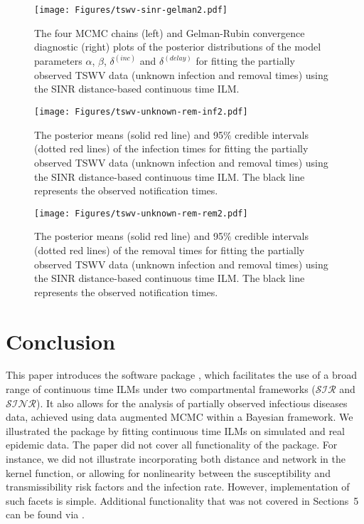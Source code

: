 \documentclass[nojss,shortnames]{jss}
\begin{document}
 
\begin{figure}[!h]
\begin{center}
\texttt{[image: Figures/tswv-sinr-gelman2.pdf]}
\caption{The four MCMC chains (left) and Gelman-Rubin convergence diagnostic (right) plots of the posterior distributions of the model parameters $\alpha$, $\beta$, $\delta^{(inc)}$ and $\delta^{(delay)}$ for fitting the partially observed TSWV data (unknown infection and removal times) using the SINR distance-based continuous time ILM.}
\label{tswv-unknown-epidemic}
\end{center}
\end{figure}

\begin{figure}[!h]
\begin{center}
\texttt{[image: Figures/tswv-unknown-rem-inf2.pdf]}
\caption{The posterior means (solid red line) and 95$\%$ credible intervals (dotted red lines) of the infection times for fitting the partially observed TSWV data (unknown infection and removal times) using the SINR distance-based continuous time ILM. The black line represents the observed notification times.}
\label{infection-tswv}
\end{center}
\end{figure}


\begin{figure}[!h]
\begin{center}
\texttt{[image: Figures/tswv-unknown-rem-rem2.pdf]}
\caption{The posterior means (solid red line) and 95$\%$ credible intervals (dotted red lines) of the removal times for fitting the partially observed TSWV data (unknown infection and removal times) using the SINR distance-based continuous time ILM. The black line represents the observed notification times.}
\label{removal-tswv}
\end{center}
\end{figure}



\section{Conclusion}

This paper introduces the  software package , which facilitates the use of a broad range of continuous time ILMs under two compartmental frameworks ($\mathcal{SIR}$ and $\mathcal{SINR}$). It also allows for the analysis of partially observed infectious diseases data, achieved using data augmented MCMC within a Bayesian framework. We illustrated the package by fitting continuous time ILMs on simulated and real epidemic data. The paper did not cover all functionality of the package. For instance, we did not illustrate incorporating both distance and network in the kernel function, or allowing for nonlinearity between the susceptibility and transmissibility risk factors and the infection rate. However, implementation of such facets is simple. Additional functionality that was not covered in Sections~5 can be found via .
\end{document}
